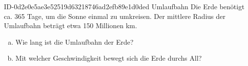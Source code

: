 \begin{exercise}
      {ID-0d2e0e5ae3e52519d63218746ad2efb89e1d0ded}
      {Umlaufbahn}
  \ifproblem\problem
    Die Erde benötigt ca. 365 Tage, um die Sonne einmal zu umkreisen.
    Der mittlere Radius der Umlaufbahn beträgt etwa 150 Millionen \si{\kilo\metre}.
    \begin{enumerate}[a)]
      \item Wie lang ist die Umlaufbahn der Erde?
      \item Mit welcher Geschwindigkeit bewegt sich die Erde durchs All?
    \end{enumerate}
  \fi
\end{exercise}
